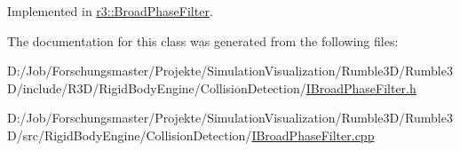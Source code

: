 Implemented in \mbox{\hyperlink{classr3_1_1_broad_phase_filter_a16b87610362f670906ca7d9a3251815f}{r3\+::\+Broad\+Phase\+Filter}}.



The documentation for this class was generated from the following files\+:\begin{DoxyCompactItemize}
\item 
D\+:/\+Job/\+Forschungsmaster/\+Projekte/\+Simulation\+Visualization/\+Rumble3\+D/\+Rumble3\+D/include/\+R3\+D/\+Rigid\+Body\+Engine/\+Collision\+Detection/\mbox{\hyperlink{_i_broad_phase_filter_8h}{I\+Broad\+Phase\+Filter.\+h}}\item 
D\+:/\+Job/\+Forschungsmaster/\+Projekte/\+Simulation\+Visualization/\+Rumble3\+D/\+Rumble3\+D/src/\+Rigid\+Body\+Engine/\+Collision\+Detection/\mbox{\hyperlink{_i_broad_phase_filter_8cpp}{I\+Broad\+Phase\+Filter.\+cpp}}\end{DoxyCompactItemize}
